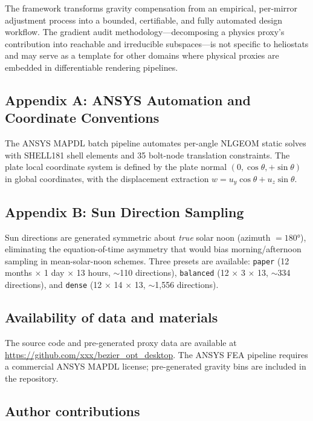 \documentclass{CVM}
\begin{document}
The framework transforms gravity compensation from an empirical,
per-mirror adjustment process into a bounded, certifiable, and fully automated
design workflow. The gradient audit methodology---decomposing a physics proxy's
contribution into reachable and irreducible subspaces---is not specific to
heliostats and may serve as a template for other domains where physical
proxies are embedded in differentiable rendering pipelines.

\appendix

\subsection*{Appendix A: ANSYS Automation and Coordinate Conventions}

The ANSYS MAPDL batch pipeline automates per-angle NLGEOM static solves with
SHELL181 shell elements and 35 bolt-node translation constraints. The plate
local coordinate system is defined by the plate normal
$(0, \cos\theta, +\sin\theta)$ in global coordinates, with the displacement
extraction $w = u_y \cos\theta + u_z \sin\theta$.

\subsection*{Appendix B: Sun Direction Sampling}

Sun directions are generated symmetric about \emph{true} solar noon
(azimuth $= 180\si{\degree}$), eliminating the equation-of-time asymmetry that
would bias morning/afternoon sampling in mean-solar-noon schemes. Three
presets are available: \verb|paper| (12 months $\times$ 1 day $\times$ 13
hours, $\sim$110 directions), \verb|balanced| (12 $\times$ 3 $\times$ 13,
$\sim$334 directions), and \verb|dense| (12 $\times$ 14 $\times$ 13,
$\sim$1,556 directions).

\subsection*{Availability of data and materials}

The source code and pre-generated proxy data are available at
\url{https://github.com/xxx/bezier_opt_desktop}. The ANSYS FEA pipeline
requires a commercial ANSYS MAPDL license; pre-generated gravity bins are
included in the repository.

\subsection*{Author contributions}
\end{document}
